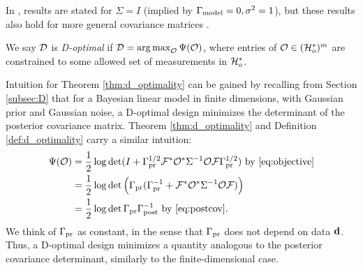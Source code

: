 In \cite{AlexanderianGloorGhattas14, alexanderian2018efficient},
results are stated for \(\Sigma=I\) (implied by \(\Gamma_{\textup{model}} =
0,\sigma^2=1\)), but these results also hold for more general
covariance matrices \cite[p. 681]{AlexanderianGloorGhattas14}.

\begin{definition}\label{def:d_optimality}
  We say \(\mathcal{D}\) is \emph{D-optimal} if \(\mathcal{D} =
  \operatorname*{arg\,max}_{\mathcal{O}} \Psi(\mathcal{O})\), where entries of \(\mathcal{O} \in (\mathcal{H}_o^*)^m\)
  are constrained to some allowed set of measurements in \(\mathcal{H}_o^*\).
\end{definition}

Intuition for Theorem \ref{thm:d_optimality} can be gained by
recalling from Section \ref{subsec:D} that for a Bayesian linear model
in finite dimensions, with Gaussian prior and Gaussian noise, a
D-optimal design minimizes the determinant of the posterior covariance
matrix. Theorem
\ref{thm:d_optimality} and Definition \ref{def:d_optimality} carry a
similar intuition:
\begin{align*}
  \begin{split}
    \tar(\obs) &= \frac12 \log \det ( I + \prcov^{1/2}  \fwd ^* \obs^* \Sigma^{-1} \obs \fwd \prcov^{1/2}) \text{ by \eqref{eq:objective}}\\
    &= \frac12 \log \det \Big( \prcov ( \prcov^{-1} + \fwd ^* \obs^* \Sigma^{-1} \obs \fwd) \Big )\\
    &= \frac12 \log \det \prcov \postcov^{-1} \text{ by \eqref{eq:postcov}}.
  \end{split}
\end{align*}
We think of \(\Gamma_{\textup{pr}}\) as constant, in the sense that $\Gamma_{\textup{pr}}$ does
not depend on data $\mathbf{d}$. Thus, a D-optimal design minimizes a
quantity analogous to the posterior covariance determinant, similarly
to the finite-dimensional case.


